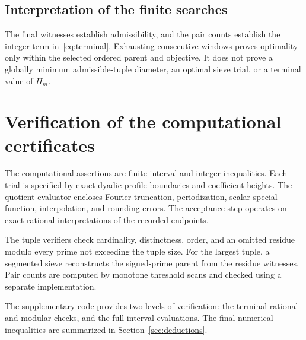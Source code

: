 \documentclass[11pt,a4paper]{article}
\theoremstyle{definition}\newtheorem{definition}[theorem]{Definition}
\theoremstyle{remark}\newtheorem{remark}[theorem]{Remark}
\numberwithin{equation}{section}
\begin{document}
\subsection{Interpretation of the finite searches}
The final witnesses establish admissibility, and the pair counts establish the integer term in~\eqref{eq:terminal}. Exhausting consecutive windows proves optimality only within the selected ordered parent and objective. It does not prove a globally minimum admissible-tuple diameter, an optimal sieve trial, or a terminal value of $H_m$.

\section{Verification of the computational certificates}\label{sec:status}
The computational assertions are finite interval and integer inequalities. Each trial is specified by exact dyadic profile boundaries and coefficient heights. The quotient evaluator encloses Fourier truncation, periodization, scalar special-function, interpolation, and rounding errors. The acceptance step operates on exact rational interpretations of the recorded endpoints.

The tuple verifiers check cardinality, distinctness, order, and an omitted residue modulo every prime not exceeding the tuple size. For the largest tuple, a segmented sieve reconstructs the signed-prime parent from the residue witnesses. Pair counts are computed by monotone threshold scans and checked using a separate implementation.

The supplementary code provides two levels of verification: the terminal rational and modular checks, and the full interval evaluations. The final numerical inequalities are summarized in Section~\ref{sec:deductions}.
\end{document}
